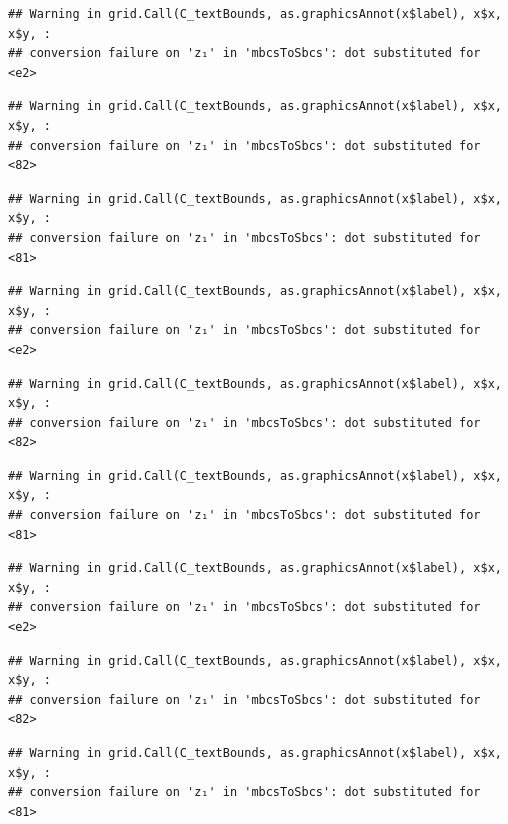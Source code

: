 \documentclass[]{article}
\begin{document}
\begin{verbatim}
## Warning in grid.Call(C_textBounds, as.graphicsAnnot(x$label), x$x, x$y, :
## conversion failure on 'z₁' in 'mbcsToSbcs': dot substituted for <e2>
\end{verbatim}

\begin{verbatim}
## Warning in grid.Call(C_textBounds, as.graphicsAnnot(x$label), x$x, x$y, :
## conversion failure on 'z₁' in 'mbcsToSbcs': dot substituted for <82>
\end{verbatim}

\begin{verbatim}
## Warning in grid.Call(C_textBounds, as.graphicsAnnot(x$label), x$x, x$y, :
## conversion failure on 'z₁' in 'mbcsToSbcs': dot substituted for <81>
\end{verbatim}

\begin{verbatim}
## Warning in grid.Call(C_textBounds, as.graphicsAnnot(x$label), x$x, x$y, :
## conversion failure on 'z₁' in 'mbcsToSbcs': dot substituted for <e2>
\end{verbatim}

\begin{verbatim}
## Warning in grid.Call(C_textBounds, as.graphicsAnnot(x$label), x$x, x$y, :
## conversion failure on 'z₁' in 'mbcsToSbcs': dot substituted for <82>
\end{verbatim}

\begin{verbatim}
## Warning in grid.Call(C_textBounds, as.graphicsAnnot(x$label), x$x, x$y, :
## conversion failure on 'z₁' in 'mbcsToSbcs': dot substituted for <81>
\end{verbatim}

\begin{verbatim}
## Warning in grid.Call(C_textBounds, as.graphicsAnnot(x$label), x$x, x$y, :
## conversion failure on 'z₁' in 'mbcsToSbcs': dot substituted for <e2>
\end{verbatim}

\begin{verbatim}
## Warning in grid.Call(C_textBounds, as.graphicsAnnot(x$label), x$x, x$y, :
## conversion failure on 'z₁' in 'mbcsToSbcs': dot substituted for <82>
\end{verbatim}

\begin{verbatim}
## Warning in grid.Call(C_textBounds, as.graphicsAnnot(x$label), x$x, x$y, :
## conversion failure on 'z₁' in 'mbcsToSbcs': dot substituted for <81>
\end{verbatim}
\end{document}
